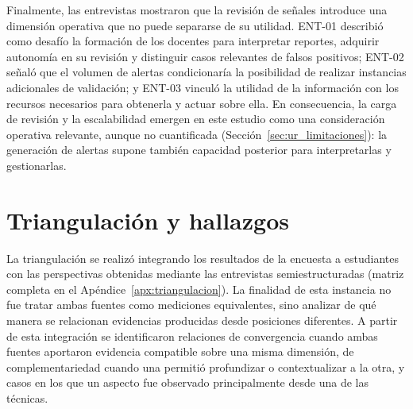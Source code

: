 Finalmente, las entrevistas mostraron que la revisión de señales introduce una dimensión operativa que no puede separarse de su utilidad. ENT-01 describió como desafío la formación de los docentes para interpretar reportes, adquirir autonomía en su revisión y distinguir casos relevantes de falsos positivos; ENT-02 señaló que el volumen de alertas condicionaría la posibilidad de realizar instancias adicionales de validación; y ENT-03 vinculó la utilidad de la información con los recursos necesarios para obtenerla y actuar sobre ella. En consecuencia, la carga de revisión y la escalabilidad emergen en este estudio como una consideración operativa relevante, aunque no cuantificada (Sección~\ref{sec:ur_limitaciones}): la generación de alertas supone también capacidad posterior para interpretarlas y gestionarlas.

\section{Triangulación y hallazgos}

La triangulación se realizó integrando los resultados de la encuesta a estudiantes con las perspectivas obtenidas mediante las entrevistas semiestructuradas (matriz completa en el Apéndice~\ref{apx:triangulacion}). La finalidad de esta instancia no fue tratar ambas fuentes como mediciones equivalentes, sino analizar de qué manera se relacionan evidencias producidas desde posiciones diferentes. A partir de esta integración se identificaron relaciones de convergencia cuando ambas fuentes aportaron evidencia compatible sobre una misma dimensión, de complementariedad cuando una permitió profundizar o contextualizar a la otra, y casos en los que un aspecto fue observado principalmente desde una de las técnicas.


